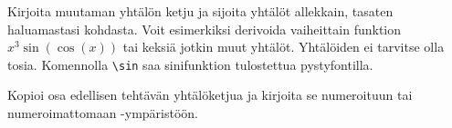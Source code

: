 %

\begin{fframe}
    \begin{harj}
        Kirjoita muutaman yhtälön ketju ja sijoita yhtälöt allekkain, tasaten haluamastasi kohdasta. Voit esimerkiksi derivoida vaiheittain funktion \(x^3\sin(\cos(x))\) tai keksiä jotkin muut yhtälöt. Yhtälöiden ei tarvitse olla tosia. Komennolla \lstinline-\sin- saa sinifunktion tulostettua pystyfontilla.
    \end{harj}
    \begin{harj}
        Kopioi osa edellisen tehtävän yhtälöketjua ja kirjoita se numeroituun tai numeroimattomaan -ympäristöön. 
    \end{harj}
\end{fframe}

